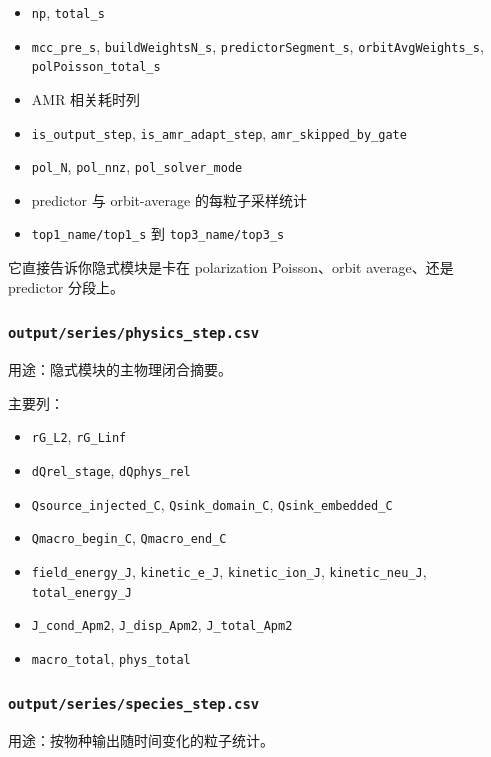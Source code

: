 \documentclass[11pt,a4paper]{ctexart}
\newcommand{\code}[1]{\texttt{#1}}
\newcommand{\file}[1]{\texttt{#1}}
\begin{document}
\begin{itemize}
  \item \code{np}, \code{total\_s}
  \item \code{mcc\_pre\_s}, \code{buildWeightsN\_s}, \code{predictorSegment\_s}, \code{orbitAvgWeights\_s}, \code{polPoisson\_total\_s}
  \item AMR 相关耗时列
  \item \code{is\_output\_step}, \code{is\_amr\_adapt\_step}, \code{amr\_skipped\_by\_gate}
  \item \code{pol\_N}, \code{pol\_nnz}, \code{pol\_solver\_mode}
  \item predictor 与 orbit-average 的每粒子采样统计
  \item \code{top1\_name/top1\_s} 到 \code{top3\_name/top3\_s}
\end{itemize}

它直接告诉你隐式模块是卡在 polarization Poisson、orbit average、还是 predictor 分段上。

\subsubsection{\file{output/series/physics\_step.csv}}

用途：隐式模块的主物理闭合摘要。

主要列：

\begin{itemize}
  \item \code{rG\_L2}, \code{rG\_Linf}
  \item \code{dQrel\_stage}, \code{dQphys\_rel}
  \item \code{Qsource\_injected\_C}, \code{Qsink\_domain\_C}, \code{Qsink\_embedded\_C}
  \item \code{Qmacro\_begin\_C}, \code{Qmacro\_end\_C}
  \item \code{field\_energy\_J}, \code{kinetic\_e\_J}, \code{kinetic\_ion\_J}, \code{kinetic\_neu\_J}, \code{total\_energy\_J}
  \item \code{J\_cond\_Apm2}, \code{J\_disp\_Apm2}, \code{J\_total\_Apm2}
  \item \code{macro\_total}, \code{phys\_total}
\end{itemize}

\subsubsection{\file{output/series/species\_step.csv}}

用途：按物种输出随时间变化的粒子统计。
\end{document}
